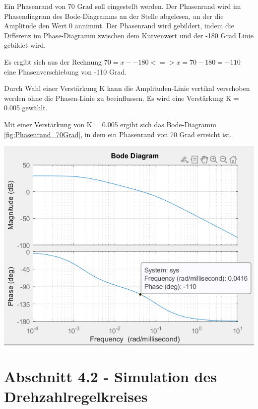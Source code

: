 \documentclass[            %
draft = false,             		%
paper = A4,                		%
pagesize = pdftex,         		%
fontsize = 10pt,           		%
DIV=15,                    		%
twoside = false,           		%
twocolumn = false,         		%
parskip = full,           		%
chapterprefix = false,      		%
appendixprefix = true,     		%
headinclude = false,       		%
footinclude = false,       		%
mpinclude = false,         		%
numbers = auto,            		%
cleardoublepage = plain,   		%
footnotes = multiple,      		%
titlepage = true,          		%
headings = normal,         		%
open = right,              		%
bibliography = openstyle,  		%
listof = chaptergapline,   		%
overfullrule = true,
]{scrbook}
\begin{document}
Ein Phasenrand von 70 Grad soll eingestellt werden.
Der Phasenrand wird im Phasendiagram des Bode-Diagramms an der Stelle abgelesen, an der die Amplitude den Wert 0 annimmt.
Der Phasenrand wird gebildert, indem die Differenz im Phase-Diagramm zwischen dem Kurvenwert und der -180 Grad Linie gebildet wird.

Es ergibt sich aus der Rechnung $70 = x - -180 <=> x = 70 - 180 = -110$ eine Phasenverschiebung von -110 Grad.

Durch Wahl einer Verstärkung K kann die Amplituden-Linie vertikal verschoben werden ohne die Phasen-Linie zu beeinflussen.
Es wird eine Verstärkung K = 0.005 gewählt.

Mit einer Verstärkung von K = 0.005 ergibt sich das Bode-Diagramm \ref{fig:Phasenrand_70Grad}, in dem ein Phasenrand von 70 Grad erreicht ist.

\begin{center}
   \begin{minipage}[b]{0.6\textwidth}
      \includegraphics[scale=0.7]{Bilder/Phasenrand_70Grad.PNG}
      \label{fig:Phasenrand_70Grad} 
   \end{minipage}
\end{center}





\newpage
{\let\clearpage\relax \chapter{Abschnitt 4.2 - Simulation des Drehzahlregelkreises}} \label{chpt:SimulationRevolutionControlLoop}
\end{document}

